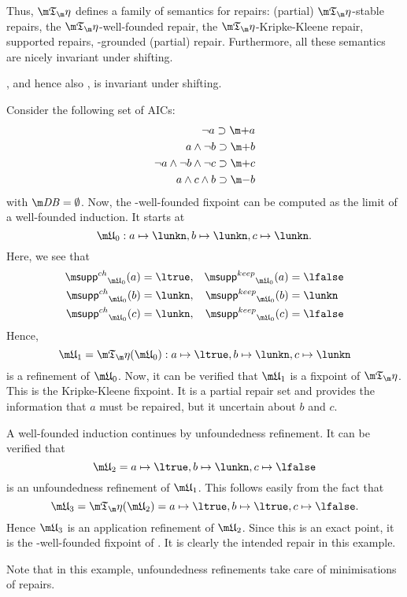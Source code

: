 

Thus, $\Ap$ defines a family of semantics for repairs: (partial) $\Ap$-stable repairs, the $\Ap$-well-founded repair, the $\Ap$-Kripke-Kleene repair, supported repairs, \Ap-grounded (partial) repair.
Furthermore, all these semantics are nicely invariant under shifting. 
\begin{proposition}
 \Ap, and hence also \Op, is invariant under shifting.
\end{proposition}

\begin{example}
 Consider the following set \aics of AICs:
\begin{align*}
 \lnot a \aicrule \add a\\
 a \land \lnot b \aicrule \add b\\
 \lnot a \land \lnot b \land \lnot c \aicrule \add c\\
 a \land c \land b \aicrule \remove b
\end{align*} with $\db = \emptyset$.
Now, the \Ap-well-founded fixpoint can be computed as the limit of a well-founded induction. It starts at
\[\UUU_0: a\mapsto \lunkn, b\mapsto \lunkn, c\mapsto\lunkn.\]
Here, we see that 
\begin{align*}
 \suppin_{\UUU_0}(a) &= \ltrue, & \suppout_{\UUU_0}(a) &=\lfalse \\
 \suppin_{\UUU_0}(b) &= \lunkn, & \suppout_{\UUU_0}(b) &=\lunkn \\
 \suppin_{\UUU_0}(c) &= \lunkn, & \suppout_{\UUU_0}(c) &=\lfalse 
\end{align*}
Hence, 
\[\UUU_1 = \Ap(\UUU_0): a\mapsto \ltrue, b\mapsto \lunkn, c\mapsto\lunkn\]
is a refinement of $\UUU_0$. 
Now, it can be verified that $\UUU_1$ is a fixpoint of $\Ap$. This is the Kripke-Kleene fixpoint. It is a partial repair set and provides the information that $a$ must be repaired, but it uncertain about $b$ and $c$. 

A well-founded induction continues by unfoundedness refinement. 
It can be verified that 
\[\UUU_2 = a\mapsto \ltrue, b\mapsto \lunkn, c\mapsto\lfalse\]
is an unfoundedness refinement of $\UUU_1$.
This follows easily from the fact that 
\[\UUU_3 = \Ap(\UUU_2)= a\mapsto \ltrue, b\mapsto \ltrue, c\mapsto\lfalse.\]
Hence $\UUU_3$ is an application refinement of $\UUU_2$. Since this is an exact point, it is the \Ap-well-founded fixpoint of \Op. It is clearly the intended repair in this example.

Note that in this example, unfoundedness refinements take care of minimisations of repairs.  
\end{example}

